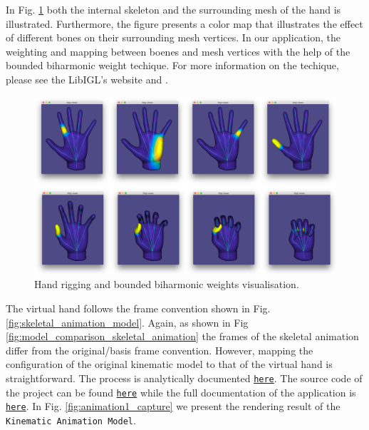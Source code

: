 In Fig. \ref{fig:hand_bbw} both the internal skeleton and the surrounding 
mesh of the hand is illustrated. Furthermore, the figure presents a color 
map that illustrates the effect of different bones on their surrounding 
mesh vertices. In our application, the weighting and mapping between 
boenes and mesh vertices with the help of the 
bounded biharmonic weight techique. For more information 
on the techique, please see the LibIGL's website and \cite{jacobson_bounded_2011}.
\begin{figure}
    \centering\includegraphics[width=1.0 \linewidth]{Figures/hand_bbw.jpg}
    \caption{Hand rigging and bounded biharmonic weights visualisation.}
    \label{fig:hand_bbw}
\end{figure}
The virtual hand follows the frame convention shown in Fig.
\ref{fig:skeletal_animation_model}.
Again, as shown in Fig \ref{fig:model_comparison_skeletal_animation}
the frames of the skeletal animation differ from the original/basis frame 
convention. However, mapping the configuration of the original kinematic model 
to that of the virtual hand is straightforward. The process is analytically
documented
\texttt{\href{https://amartsop.github.io/SkeletalAnimationMultiThread/classAnimatedHand.html}{here}}.
The source code of the project can be found 
\texttt{\href{https://github.com/amartsop/SkeletalAnimationMultiThread}{here}}
while the full documentation of the application is
\texttt{\href{https://amartsop.github.io/SkeletalAnimationMultiThread/index.html}{here}}.
In Fig. \ref{fig:animation1_capture} we present the rendering result of 
the \texttt{Kinematic Animation Model}.
